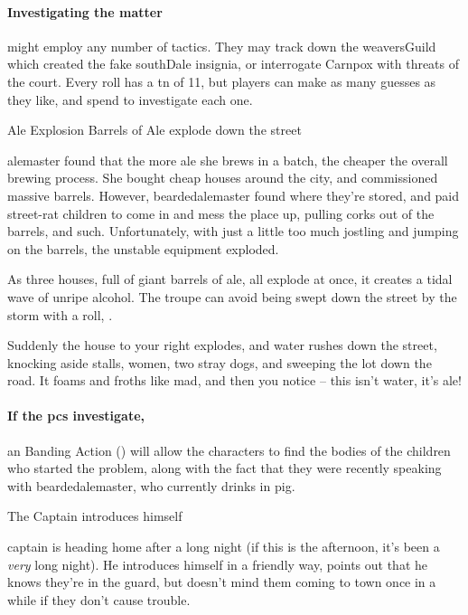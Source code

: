 \paragraph{Investigating the matter}
might employ any number of tactics.
They may track down the \gls{weaversGuild} which created the fake \gls{southDale} insignia, or interrogate Carnpox with threats of the \gls{court}.
Every roll has a \gls{tn} of 11, but players can make as many guesses as they like, and spend  to investigate each one.

{Ale Explosion}%
{Barrels of Ale explode down the street}%

\Gls{alemaster} found that the more ale she brews in a batch, the cheaper the overall brewing process.
She bought cheap houses around the city, and commissioned massive barrels.
However, \gls{beardedalemaster} found where they're stored, and paid street-rat children to come in and mess the place up, pulling corks out of the barrels, and such.
Unfortunately, with just a little too much jostling and jumping on the barrels, the unstable equipment exploded.

As three houses, full of giant barrels of ale, all explode at once, it creates a tidal wave of unripe alcohol.
The troupe can avoid being swept down the street by the storm with a  roll, \tn[8].

\begin{boxtext}
  Suddenly the house to your right explodes, and water rushes down the street, knocking aside stalls, women, two stray dogs, and sweeping the lot down the road.  It foams and froths like mad, and then you notice -- this isn't water, it's ale!
\end{boxtext}

\paragraph{If the \glspl{pc} investigate,}
an  Banding Action (\tn[10]) will allow the characters to find the bodies of the children who started the problem, along with the fact that they were recently speaking with \gls{beardedalemaster}, who currently drinks in \gls{pig}.%

{\squash The Captain}%
{ introduces himself}%

\Gls{captain} is heading home after a long night (if this is the afternoon, it's been a \emph{very} long night).
He introduces himself in a friendly way, points out that he knows they're in the \gls{guard}, but doesn't mind them coming to town once in a while if they don't cause trouble.

